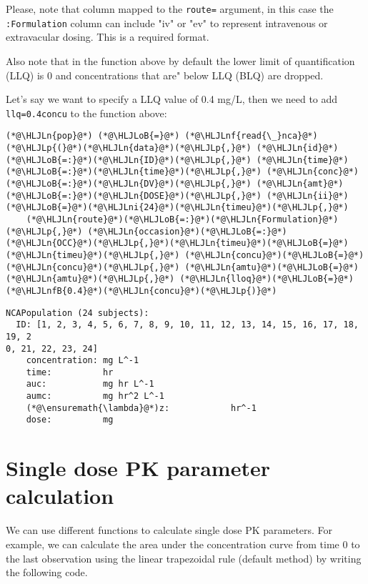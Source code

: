 \documentclass[12pt,a4paper]{article}
\newcommand{\HLJLn}[1]{#1}
\newcommand{\HLJLnf}[1]{\textcolor[RGB]{66,102,213}{#1}}
\newcommand{\HLJLnfB}[1]{\textcolor[RGB]{59,151,46}{#1}}
\newcommand{\HLJLni}[1]{\textcolor[RGB]{59,151,46}{#1}}
\newcommand{\HLJLoB}[1]{\textcolor[RGB]{102,102,102}{\textbf{#1}}}
\newcommand{\HLJLp}[1]{#1}
\begin{document}
Please, note that column mapped to the \texttt{route=} argument, in this case the \texttt{:Formulation} column can include "iv" or "ev" to represent intravenous or extravacular dosing. This is a required format.

Also note that in the function above by default the lower limit of quantification (LLQ) is 0 and concentrations that are" below LLQ (BLQ) are dropped.

Let's say we want to specify a LLQ value of 0.4 mg/L, then we need to add \texttt{llq=0.4concu} to the function above:


\begin{lstlisting}
(*@\HLJLn{pop}@*) (*@\HLJLoB{=}@*) (*@\HLJLnf{read{\_}nca}@*)(*@\HLJLp{(}@*)(*@\HLJLn{data}@*)(*@\HLJLp{,}@*) (*@\HLJLn{id}@*)(*@\HLJLoB{=:}@*)(*@\HLJLn{ID}@*)(*@\HLJLp{,}@*) (*@\HLJLn{time}@*)(*@\HLJLoB{=:}@*)(*@\HLJLn{time}@*)(*@\HLJLp{,}@*) (*@\HLJLn{conc}@*)(*@\HLJLoB{=:}@*)(*@\HLJLn{DV}@*)(*@\HLJLp{,}@*) (*@\HLJLn{amt}@*)(*@\HLJLoB{=:}@*)(*@\HLJLn{DOSE}@*)(*@\HLJLp{,}@*) (*@\HLJLn{ii}@*)(*@\HLJLoB{=}@*)(*@\HLJLni{24}@*)(*@\HLJLn{timeu}@*)(*@\HLJLp{,}@*)
    (*@\HLJLn{route}@*)(*@\HLJLoB{=:}@*)(*@\HLJLn{Formulation}@*)(*@\HLJLp{,}@*) (*@\HLJLn{occasion}@*)(*@\HLJLoB{=:}@*)(*@\HLJLn{OCC}@*)(*@\HLJLp{,}@*)(*@\HLJLn{timeu}@*)(*@\HLJLoB{=}@*)(*@\HLJLn{timeu}@*)(*@\HLJLp{,}@*) (*@\HLJLn{concu}@*)(*@\HLJLoB{=}@*)(*@\HLJLn{concu}@*)(*@\HLJLp{,}@*) (*@\HLJLn{amtu}@*)(*@\HLJLoB{=}@*)(*@\HLJLn{amtu}@*)(*@\HLJLp{,}@*) (*@\HLJLn{lloq}@*)(*@\HLJLoB{=}@*)(*@\HLJLnfB{0.4}@*)(*@\HLJLn{concu}@*)(*@\HLJLp{)}@*)
\end{lstlisting}

\begin{lstlisting}
NCAPopulation (24 subjects):
  ID: [1, 2, 3, 4, 5, 6, 7, 8, 9, 10, 11, 12, 13, 14, 15, 16, 17, 18, 19, 2
0, 21, 22, 23, 24]
    concentration: mg L^-1
    time:          hr
    auc:           mg hr L^-1
    aumc:          mg hr^2 L^-1
    (*@\ensuremath{\lambda}@*)z:            hr^-1
    dose:          mg
\end{lstlisting}


\section{Single dose PK parameter calculation}
We can use different functions to calculate single dose PK parameters. For example, we can calculate the area under the concentration curve from time 0 to the last observation using the linear trapezoidal rule (default method) by writing the following code.
\end{document}
